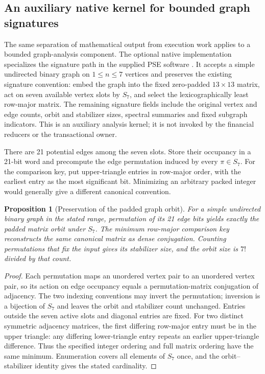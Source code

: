 \documentclass[11pt,a4paper]{article}
\newtheorem{proposition}[theorem]{Proposition}
\theoremstyle{definition}\newtheorem{definition}[theorem]{Definition}
\begin{document}
\subsection{An auxiliary native kernel for bounded graph signatures}\label{sec:packedgraph}
The same separation of mathematical output from execution work applies to a bounded graph-analysis component. The optional native implementation specializes the signature path in the supplied PSE software \cite{psearchive}. It accepts a simple undirected binary graph on $1\leq n\leq7$ vertices and preserves the existing signature convention: embed the graph into the fixed zero-padded $13\times13$ matrix, act on seven available vertex slots by $S_7$, and select the lexicographically least row-major matrix. The remaining signature fields include the original vertex and edge counts, orbit and stabilizer sizes, spectral summaries and fixed subgraph indicators. This is an auxiliary analysis kernel; it is not invoked by the financial reducers or the transactional owner.

There are 21 potential edges among the seven slots. Store their occupancy in a 21-bit word and precompute the edge permutation induced by every $\pi\in S_7$. For the comparison key, put upper-triangle entries in row-major order, with the earliest entry as the most significant bit. Minimizing an arbitrary packed integer would generally give a different canonical convention.

\begin{proposition}[Preservation of the padded graph orbit]\label{prop:packedorbit}
For a simple undirected binary graph in the stated range, permutation of its 21 edge bits yields exactly the padded matrix orbit under $S_7$. The minimum row-major comparison key reconstructs the same canonical matrix as dense conjugation. Counting permutations that fix the input gives its stabilizer size, and the orbit size is $7!$ divided by that count.
\end{proposition}
\begin{proof}
Each permutation maps an unordered vertex pair to an unordered vertex pair, so its action on edge occupancy equals a permutation-matrix conjugation of adjacency. The two indexing conventions may invert the permutation; inversion is a bijection of $S_7$ and leaves the orbit and stabilizer count unchanged. Entries outside the seven active slots and diagonal entries are fixed. For two distinct symmetric adjacency matrices, the first differing row-major entry must be in the upper triangle: any differing lower-triangle entry repeats an earlier upper-triangle difference. Thus the specified integer ordering and full matrix ordering have the same minimum. Enumeration covers all elements of $S_7$ once, and the orbit--stabilizer identity gives the stated cardinality.
\end{proof}
\end{document}
